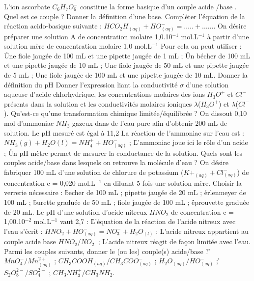 \q
L'ion ascorbate $C_6H_7O_6^{-}$ constitue la forme basique d'un couple acide /base . 
Quel est ce couple ? 
\q
Donner la définition d'une base.
\q
Compléter l'équation de la réaction acido-basique suivante :
$HCO_2H_{(aq)}+ HO^{-}_{(aq)} =       …..     +  …….$
\q	
On désire préparer une solution A de concentration molaire 1,0.10$^{-1}$ mol.L$^{-1}$ à partir  d'une solution mère de concentration molaire 1,0 mol.L$^{-1}$  Pour cela on peut utiliser :
\r
Une fiole jaugée de 100 mL et une pipette jaugée de 1 mL ;
\r
Un bécher de 100 mL et une pipette jaugée de 10 mL ;
\rv
Une fiole jaugée de 50 mL et une pipette jaugée de 5 mL ;
\rv
Une fiole jaugée de 100 mL et une pipette jaugée de 10 mL.
\q	
 Donner la définition du pH
\q	
 Donner l'expression liant la conductivité $\sigma$ d'une solution aqueuse 
d'acide chlorhydrique, les concentrations molaires des ions $H_3O^+$ et $Cl^{-}$ 
présents dans la solution et les conductivités molaires ioniques  $\lambda$($H_3O^+$) et  $\lambda$($Cl^{-}$).
\q	
  Qu'est-ce qu'une transformation chimique limitée/équilibrée ?
\q
  	On dissout 0,10 mol d'ammoniac $NH_3$ gazeux dans de l'eau pure afin d'obtenir 200 mL de solution.
Le pH mesuré est égal à 11,2
\rv
  La réaction de l'ammoniac sur l'eau est : $NH_3(g) + H_2O(l) = NH_4^+ +  HO^{-}_{(aq)}$ ;
\r
  L'ammoniac joue ici le rôle d'un acide ;
\r
  Un pH-mètre permet de mesurer la conductance de la solution.
\q	
  Quels sont les couples acide/base dans lesquels on retrouve la molécule d'eau   ?
\q	
 On désire fabriquer 100 mL d'une solution de chlorure de potassium ($K+_{(aq)} + Cl^{-}_{(aq)}$) de concentration   c = 0,020 mol.L$^{-1}$ en diluant 5 fois une solution mère. Choisir la verrerie nécessaire :
\r
  becher de 100 mL ;		
\rv
    pipette jaugée de 20 mL ;
\r
  erlenmeyer de 100 mL ;	
\r
  	  burette graduée de 50 mL ;
\rv
  fiole jaugée de 100 mL ; 
\r
              	  éprouvette graduée de 20 mL.
\q
   	Le pH d'une solution d'acide nitreux $HNO_2$ de concentration c = 1,00.10$^{-2}$ mol.L$^{-1}$ vaut 2,7 :
\r  
L'équation de la réaction de l'acide nitreux avec l'eau s'écrit : 
$HNO_2 + HO^{-}_{(aq)}  = NO_3^{-} + H_2O_(l)$ ;
\rv
  L'acide nitreux appartient au couple acide base $HNO_2/NO_2^-$ ;
\rv
  L'acide nitreux réagit de façon limitée avec l'eau.
\q	
   Parmi les couples suivants, donner le (ou les) couple(s) acide/base ?
\r
 	$MnO_4^- / Mn^{2+}_{(aq)}$ ;
\rv
 	$CH_3COOH_{(aq)} / CH_3COO^{-}_{(aq)}$ ;
\rv
 	$H_2O_{(aq)} / HO^{-}_{(aq)}$ ;
\r
 	$S_2O_8^{2-}/ SO_4^{2-}$ ;
\rv
 	$CH_3NH_3^+ / CH_3NH_2$.

